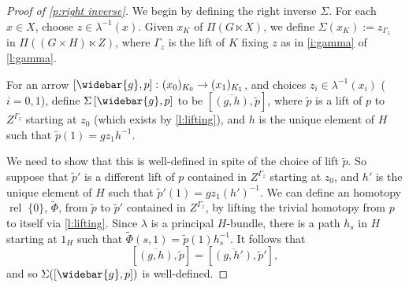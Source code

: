 \documentclass[12pt,reqno]{amsart}
\newcommand{\rel}{{\operatorname{rel}}} %
\theoremstyle{plain}
\theoremstyle{definition}
\begin{document}
    \begin{proof}[Proof of \cref{p:right inverse}]
    We begin by defining the right inverse $\Sigma$.  
        For each $x\in X$, choose $z\in\lambda^{-1}(x)$.  Given  $x_K$ of $\Pi(G\ltimes X)$, we define $\Sigma(x_K):=z_{\Gamma_z}$ in $\Pi((G\times H)\ltimes Z)$, where $\Gamma_z$  is the lift of $K$ fixing $z$ as in \cref{i:gamma} of \cref{l:gamma}.  

        For an arrow $\left[\widebar{g},p\right]\colon(x_0)_{K_0}\to(x_1)_{K_1}$, and choices $z_i\in\lambda^{-1}(x_i)$ ($i=0,1$), define $\Sigma\left[\widebar{g},p\right]$ to be $\left[\overline{(g,h)},\widetilde{p}\right]$, where $\widetilde{p}$ is a lift of $p$ to $Z^{\Gamma_z}$ starting at $z_0$ (which exists by \cref{l:lifting}), and $h$ is the unique element of $H$ such that $\widetilde{p}(1)=gz_1h^{-1}$.  

        We need to show that this is well-defined in spite of the choice of lift $\widetilde{p}$.   So suppose that $\widetilde{p}'$ is a different lift of $p$ contained in $Z^{\Gamma_z}$ starting at $z_0$, and $h'$ is the unique element of $H$ such that $\widetilde{p}'(1)=gz_1(h')^{-1}$.  We can define an homotopy  $\rel\;\{0\}$,  $\widetilde{\Phi}$,  from $\widetilde{p}$ to $\widetilde{p}'$ contained in $Z^{\Gamma_z}$, by lifting the trivial homotopy from $p$ to itself via \cref{l:lifting}.  Since $\lambda$ is a principal $H$-bundle, there is a path $h_s$ in $H$ starting at $1_H$ such that $\widetilde{\Phi}(s,1)=\widetilde{p}(1)h_s^{-1}$.  It follows that $$\left[\overline{\left(g,h\right)},\widetilde{p}\right]=\left[\overline{\left(g,h'\right)},\widetilde{p}'\right],$$ and so $\Sigma([\widebar{g},p])$ is well-defined.


\end{proof}
\end{document}
